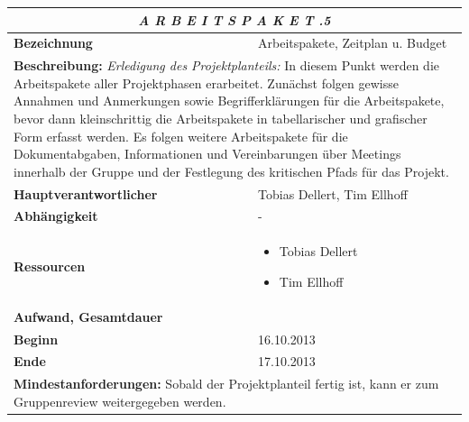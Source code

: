 \documentclass[fontsize=12pt,paper=a4,twoside]{scrartcl}
\begin{document}
\begin{tabular}{p{7.5cm}|p{7.5cm}}\toprule
\multicolumn{2}{c}{\textbf{\textit{A R B E I T S P A K E T \quad 1.1.5}}} \\ \toprule \hline
\textbf{Bezeichnung} & Arbeitspakete, Zeitplan u. Budget\\\hline
\multicolumn{2}{p{15cm}}{\textbf{Beschreibung:} \newline 
\textit{Erledigung des Projektplanteils:} In diesem Punkt werden die Arbeitspakete aller Projektphasen erarbeitet. Zunächst folgen gewisse Annahmen und Anmerkungen sowie Begrifferklärungen für die Arbeitspakete, bevor dann kleinschrittig die Arbeitspakete in tabellarischer und grafischer Form erfasst werden. Es folgen weitere Arbeitspakete für die Dokumentabgaben, Informationen und Vereinbarungen über Meetings innerhalb der Gruppe und der Festlegung des kritischen Pfads für das Projekt.}  \\\hline
\textbf{Hauptverantwortlicher} & Tobias Dellert, Tim Ellhoff \\\hline
\textbf{Abhängigkeit} & -\\\hline
\textbf{Ressourcen} & \begin{itemize}
\itemsep0pt
\item Tobias Dellert
\item Tim Ellhoff
\end{itemize} \\\hline
\textbf{Aufwand, Gesamtdauer} & \\\hline
\textbf{Beginn} & 16.10.2013 \\\hline
\textbf{Ende} & 17.10.2013\\\hline
\multicolumn{2}{p{15cm}}{\textbf{Mindestanforderungen: } \newline
Sobald der Projektplanteil fertig ist, kann er zum Gruppenreview weitergegeben werden. }  \\ \toprule
\end{tabular} \\\\
\end{document}
